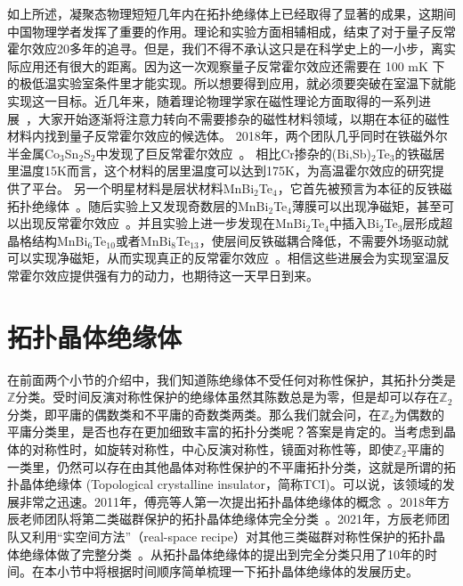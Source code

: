 如上所述，凝聚态物理短短几年内在拓扑绝缘体上已经取得了显著的成果，这期间中国物理学者发挥了重要的作用。理论和实验方面相辅相成，结束了对于量子反常霍尔效应20多年的追寻。但是，我们不得不承认这只是在科学史上的一小步，离实际应用还有很大的距离。因为这一次观察量子反常霍尔效应还需要在 100 mK 下的极低温实验室条件里才能实现。所以想要得到应用，就必须要突破在室温下就能实现这一目标。近几年来，随着理论物理学家在磁性理论方面取得的一系列进展~\citep{Watanabe2018,Elcoro2020,xuyf2020,Peng2021}，大家开始逐渐将注意力转向不需要掺杂的磁性材料领域，以期在本征的磁性材料内找到量子反常霍尔效应的候选体。
2018年，两个团队几乎同时在铁磁外尔半金属Co$_3$Sn$_2$S$_2$中发现了巨反常霍尔效应~\citep{cosns2018,2017Giant}。
相比Cr掺杂的(Bi,Sb)$_2$Te$_3$的铁磁居里温度15K而言，这个材料的居里温度可以达到175K，为高温霍尔效应的研究提供了平台。
另一个明星材料是层状材料MnBi$_2$Te$_4$，它首先被预言为本征的反铁磁拓扑绝缘体~\citep{zhanghj2019,Li2019}。随后实验上又发现奇数层的MnBi$_2$Te$_4$薄膜可以出现净磁矩，甚至可以出现反常霍尔效应~\citep{zhanghj2019,mnbite2,mnbite3,mnbite4,mnbite5}。并且实验上进一步发现在MnBi$_2$Te$_4$中插入Bi$_2$Te$_3$层形成超晶格结构MnBi$_6$Te$_{10}$或者MnBi$_8$Te$_{13}$，使层间反铁磁耦合降低，不需要外场驱动就可以实现净磁矩，从而实现真正的反常霍尔效应~\citep{tian2020,hu2020}。相信这些进展会为实现室温反常霍尔效应提供强有力的动力，也期待这一天早日到来。


\section{拓扑晶体绝缘体}\label{sec:tci}
在前面两个小节的介绍中，我们知道陈绝缘体不受任何对称性保护，其拓扑分类是$\mathbb{Z}$分类。受时间反演对称性保护的绝缘体虽然其陈数总是为零，但是却可以存在$\mathbb{Z}_2$分类，即平庸的偶数类和不平庸的奇数类两类。那么我们就会问，在$\mathbb{Z}_2$为偶数的平庸分类里，是否也存在更加细致丰富的拓扑分类呢？答案是肯定的。当考虑到晶体的对称性时，如旋转对称性，中心反演对称性，镜面对称性等，即使$\mathbb{Z}_2$平庸的一类里，仍然可以存在由其他晶体对称性保护的不平庸拓扑分类，这就是所谓的拓扑晶体绝缘体 (Topological crystalline insulator，简称TCI)。可以说，该领域的发展非常之迅速。2011年，傅亮等人第一次提出拓扑晶体绝缘体的概念~\citep{fu2011topological}。2018年方辰老师团队将第二类磁群保护的拓扑晶体绝缘体完全分类~\citep{song2017}。2021年，方辰老师团队又利用“实空间方法”（real-space recipe）对其他三类磁群对称性保护的拓扑晶体绝缘体做了完整分类~\citep{Peng2021}。从拓扑晶体绝缘体的提出到完全分类只用了10年的时间。在本小节中将根据时间顺序简单梳理一下拓扑晶体绝缘体的发展历史。

